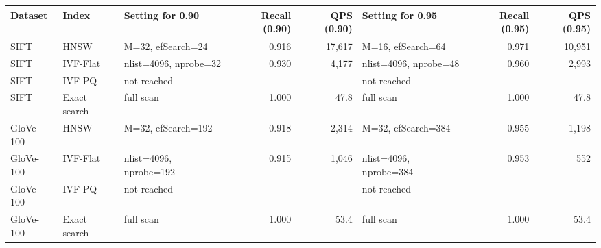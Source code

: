 \begin{tabular}{lllrrlrr}
\toprule
Dataset & Index & Setting for 0.90 & Recall (0.90) & QPS (0.90) & Setting for 0.95 & Recall (0.95) & QPS (0.95) \\
\midrule
SIFT & HNSW & M=32, efSearch=24 & 0.916 & 17,617 & M=16, efSearch=64 & 0.971 & 10,951 \\
SIFT & IVF-Flat & nlist=4096, nprobe=32 & 0.930 & 4,177 & nlist=4096, nprobe=48 & 0.960 & 2,993 \\
SIFT & IVF-PQ & not reached &  &  & not reached &  &  \\
SIFT & Exact search & full scan & 1.000 & 47.8 & full scan & 1.000 & 47.8 \\
GloVe-100 & HNSW & M=32, efSearch=192 & 0.918 & 2,314 & M=32, efSearch=384 & 0.955 & 1,198 \\
GloVe-100 & IVF-Flat & nlist=4096, nprobe=192 & 0.915 & 1,046 & nlist=4096, nprobe=384 & 0.953 & 552 \\
GloVe-100 & IVF-PQ & not reached &  &  & not reached &  &  \\
GloVe-100 & Exact search & full scan & 1.000 & 53.4 & full scan & 1.000 & 53.4 \\
\bottomrule
\end{tabular}
